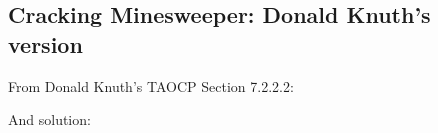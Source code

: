 \subsection{Cracking Minesweeper: Donald Knuth's version}

\renewcommand{\CURPATH}{equations/minesweeper_Knuth}

From Donald Knuth's \ac{TAOCP} Section 7.2.2.2:

\begin{figure}[H]
\centering
{}
\end{figure}

\begin{figure}[H]
\centering
{}
\end{figure}

And solution:

\begin{figure}[H]
\centering
{}
\end{figure}

\begin{figure}[H]
\centering
{}
\end{figure}
